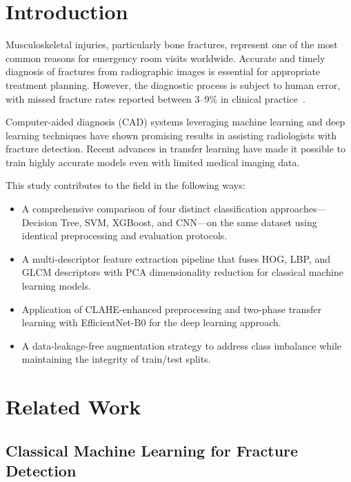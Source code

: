 \documentclass[conference]{IEEEtran}
\begin{document}
\section{Introduction}

Musculoskeletal injuries, particularly bone fractures, represent one of the most common reasons for emergency room visits worldwide. Accurate and timely diagnosis of fractures from radiographic images is essential for appropriate treatment planning. However, the diagnostic process is subject to human error, with missed fracture rates reported between 3--9\% in clinical practice~\cite{jones2020}.

Computer-aided diagnosis (CAD) systems leveraging machine learning and deep learning techniques have shown promising results in assisting radiologists with fracture detection. Recent advances in transfer learning have made it possible to train highly accurate models even with limited medical imaging data.

This study contributes to the field in the following ways:
\begin{itemize}
    \item A comprehensive comparison of four distinct classification approaches---Decision Tree, SVM, XGBoost, and CNN---on the same dataset using identical preprocessing and evaluation protocols.
    \item A multi-descriptor feature extraction pipeline that fuses HOG, LBP, and GLCM descriptors with PCA dimensionality reduction for classical machine learning models.
    \item Application of CLAHE-enhanced preprocessing and two-phase transfer learning with EfficientNet-B0 for the deep learning approach.
    \item A data-leakage-free augmentation strategy to address class imbalance while maintaining the integrity of train/test splits.
\end{itemize}

\section{Related Work}

\subsection{Classical Machine Learning for Fracture Detection}
\end{document}
